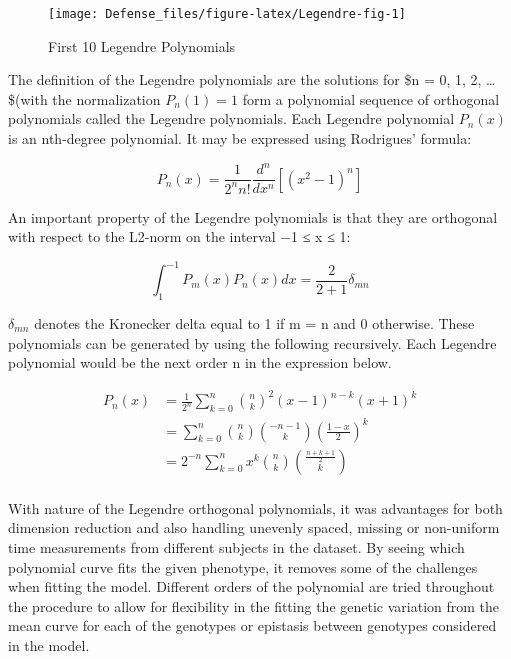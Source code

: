 \documentclass[11pt,]{book}
\theoremstyle{definition}
\theoremstyle{definition}
\theoremstyle{remark}
\begin{document}
\begin{figure}

{\centering \texttt{[image: Defense\_files/figure-latex/Legendre-fig-1]} 

}

\caption{First 10 Legendre Polynomials}\label{fig:Legendre-fig}
\end{figure}

The definition of the Legendre polynomials are the solutions for \$n =
0, 1, 2, \dots \$(with the normalization \(P_n(1) = 1\) form a
polynomial sequence of orthogonal polynomials called the Legendre
polynomials. Each Legendre polynomial \(P_n(x)\) is an nth-degree
polynomial. It may be expressed using Rodrigues' formula:

\begin{equation}
P_n(x) = \frac{1}{2^nn!} \frac{d^n}{dx^n}[(x^2-1)^n]
\label{eq:rodrigues-formula}
\end{equation}

An important property of the Legendre polynomials is that they are
orthogonal with respect to the L2-norm on the interval −1 ≤ x ≤ 1:

\begin{equation}
\int_1^{-1} P_m(x)P_n(x)dx = \frac{2}{2+1}\delta_{mn}
\label{eq:orthg-leg}
\end{equation}

\(\delta_{mn}\) denotes the Kronecker delta equal to 1 if m = n and 0
otherwise. These polynomials can be generated by using the following
recursively. Each Legendre polynomial would be the next order n in the
expression below.

\begin{equation}
\begin{split}
P_n(x) & = \frac{1}{2^n}\sum_{k=0}^{n}{{n}\choose{k}}^2(x-1)^{n-k}(x+1)^k \\
& = \sum_{k=0}^{n}{{n}\choose{k}}{{-n-1}\choose{k}}{\left(\frac{1-x}{2}\right)}^k \\
& = 2^{-n}\sum_{k=0}^{n} x^k {{n}\choose{k}}{{\frac{n+k+1}{2}}\choose{k}} \\
\end{split}
\label{eq:leg-eq}
\end{equation}

With nature of the Legendre orthogonal polynomials, it was advantages
for both dimension reduction and also handling unevenly spaced, missing
or non-uniform time measurements from different subjects in the dataset.
By seeing which polynomial curve fits the given phenotype, it removes
some of the challenges when fitting the model. Different orders of the
polynomial are tried throughout the procedure to allow for flexibility
in the fitting the genetic variation from the mean curve for each of the
genotypes or epistasis between genotypes considered in the model.
\end{document}
